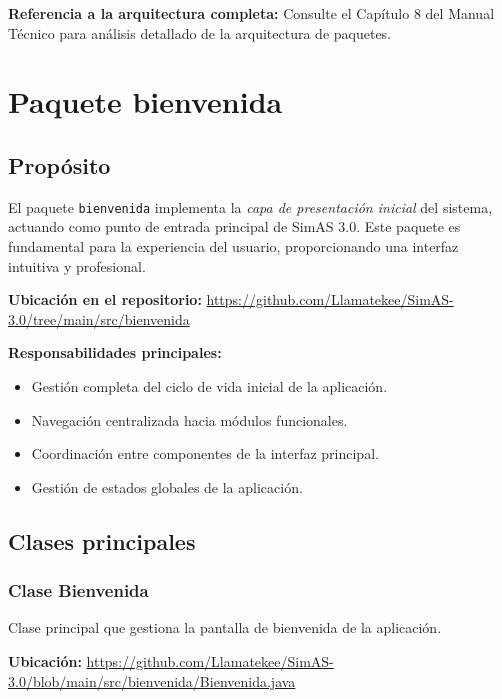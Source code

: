 \textbf{Referencia a la arquitectura completa:} Consulte el Capítulo 8 del Manual Técnico para análisis detallado de la arquitectura de paquetes.

\section{Paquete bienvenida}

\subsection{Propósito}

El paquete \texttt{bienvenida} implementa la \textit{capa de presentación inicial} del sistema, actuando como punto de entrada principal de SimAS 3.0. Este paquete es fundamental para la experiencia del usuario, proporcionando una interfaz intuitiva y profesional.

\textbf{Ubicación en el repositorio:} \url{https://github.com/Llamatekee/SimAS-3.0/tree/main/src/bienvenida}

\textbf{Responsabilidades principales:}
\begin{itemize}
    \item Gestión completa del ciclo de vida inicial de la aplicación.
    \item Navegación centralizada hacia módulos funcionales.
    \item Coordinación entre componentes de la interfaz principal.
    \item Gestión de estados globales de la aplicación.
\end{itemize}

\subsection{Clases principales}

\subsubsection{Clase Bienvenida}

Clase principal que gestiona la pantalla de bienvenida de la aplicación.

\textbf{Ubicación:} \url{https://github.com/Llamatekee/SimAS-3.0/blob/main/src/bienvenida/Bienvenida.java}


